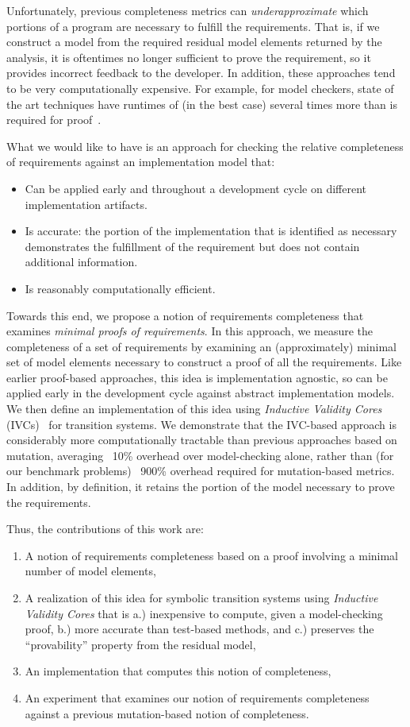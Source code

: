 Unfortunately, previous completeness metrics can {\em underapproximate} which portions of a program are necessary to fulfill the requirements.  That is, if we construct a model from the required residual model elements returned by the analysis, it is oftentimes no longer sufficient to prove the requirement, so it provides incorrect feedback to the developer.  In addition, these approaches tend to be very computationally expensive.  For example, for model checkers, state of the art techniques have runtimes of (in the best case) several times more than is required for proof~\cite{chockler2010coverage}.

What we would like to have is an approach for checking the relative completeness of requirements against an implementation model that:
\begin{itemize}
    \item Can be applied early and throughout a development cycle on different implementation artifacts.
    \item Is accurate: the portion of the implementation that is identified as necessary demonstrates the
        fulfillment of the requirement but does not contain additional information.
    \item Is reasonably computationally efficient.
\end{itemize}

\noindent Towards this end, we propose a notion of requirements completeness that examines {\em minimal proofs of requirements}.  In this approach, we measure the completeness of a set of requirements by examining an (approximately) minimal set of model elements necessary to construct a proof of all the requirements.  Like earlier proof-based approaches, this idea is implementation agnostic, so can be applied early in the development cycle against abstract implementation models.  We then define an implementation of this idea using {\em Inductive Validity Cores} (IVCs)~\cite{Ghass16} for transition systems.  We demonstrate that the IVC-based approach is considerably more computationally tractable than previous approaches based on mutation, averaging ~10\% overhead over model-checking alone, rather than (for our benchmark problems) ~900\% overhead required for mutation-based metrics.  In addition, by definition, it retains the portion of the model necessary to prove the requirements.

Thus, the contributions of this work are:
\begin{enumerate}
\item A notion of requirements completeness based on a proof involving a minimal number of model elements,
\item A realization of this idea for symbolic transition systems using {\em Inductive Validity Cores} that is a.) inexpensive to compute, given a model-checking proof, b.) more accurate than test-based methods, and c.) preserves the ``provability'' property from the residual model,
\item An implementation that computes this notion of completeness,
\item An experiment that examines our notion of requirements completeness against a previous mutation-based notion of completeness.
\end{enumerate}

